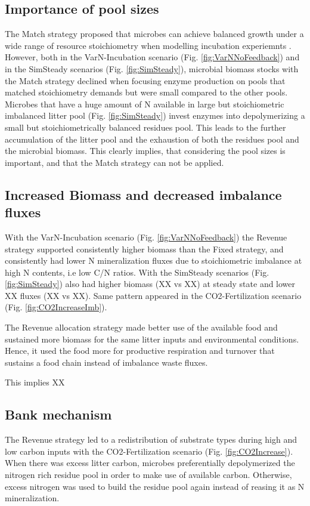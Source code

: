 \subsection{Importance of pool sizes}
The Match strategy proposed that microbes can achieve balanced growth under a
wide range of resource stoichiometry when modelling incubation experiemnts
\citep{Moorhead12, Ballentine14}.
However, both in the VarN-Incubation scenario (Fig.
\ref{fig:VarNNoFeedback}) and in the SimSteady scenarios (Fig.
\ref{fig:SimSteady}), microbial biomass stocks with the Match strategy declined
when focusing enzyme production on pools that matched stoichiometry demands but
were small compared to the other pools.
Microbes that have a huge amount of N available in large but stoichiometric
imbalanced litter pool (Fig. \ref{fig:SimSteady}) invest enzymes into
depolymerizing a small but stoichiometrically balanced residues pool. This leads
to the further accumulation of the litter pool and the exhaustion of both the
residues pool and the microbial biomass. This clearly implies, that considering
the pool sizes is important, and that the Match strategy can not be applied.

\subsection{Increased Biomass and decreased imbalance fluxes}
With the VarN-Incubation scenario (Fig.
\ref{fig:VarNNoFeedback}) the Revenue strategy supported consistently higher
biomass than the Fixed strategy, and consistently had lower N mineralization
fluxes due to stoichiometric imbalance at high N contents, i.e low C/N ratios.
With the SimSteady scenarios (Fig. \ref{fig:SimSteady}) also had higher biomass
(XX vs XX) at steady state and lower XX fluxes (XX vs XX). Same pattern appeared
in the CO2-Fertilization scenario (Fig. \ref{fig:CO2IncreaseImb}).

The Revenue allocation strategy made better use of the available
food and sustained more biomass for the same litter inputs and environmental
conditions. Hence, it used the food more for productive respiration and turnover
that sustains a food chain instead of imbalance waste fluxes.  

This implies XX

\subsection{Bank mechanism}
The Revenue strategy led to a redistribution of substrate types during high
and low carbon inputs with the  CO2-Fertilization scenario (Fig.
\ref{fig:CO2Increase}). When there was excess litter carbon, microbes
preferentially depolymerized the nitrogen rich residue pool in order to make use of available
carbon. Otherwise, excess nitrogen was used to build the residue pool again
instead of reasing it as N mineralization.
 
